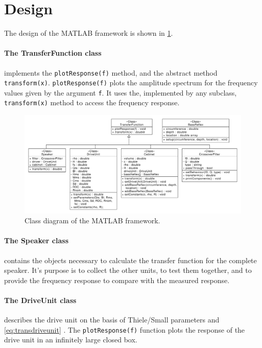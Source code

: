 \section{Design}
The design of the MATLAB framework is shown in \cref{fig:classbdd}.

\paragraph{The TransferFunction class} implements the \texttt{plotResponse(f)} method, and the  abstract method \texttt{transform(x)}.
\texttt{plotResponse(f)} plots the amplitude spectrum for the frequency values given by the argument \texttt{f}.
It uses the, implemented by any subclass, \texttt{transform(x)} method to access the frequency response.

\begin{figure}
	\centering
	\includegraphics[width=\linewidth]{gfx/Design/Class_BDD}
	\caption{Class diagram of the MATLAB framework.}
	\label{fig:classbdd}
\end{figure}

\paragraph{The Speaker class} contains the objects necessary to calculate the transfer function for the complete speaker.
It's purpose is to collect the other units, to test them together, and to provide the frequency response to compare with the measured response.

\paragraph{The DriveUnit class} describes the drive unit on the basis of Thiele/Small parameters \cite{thielesmall} and \cref{eq:transdriveunit} \cite[p.~51]{Elektroakustik}.
The \texttt{plotResponse(f)} function plots the response of the drive unit in an infinitely large closed box.

